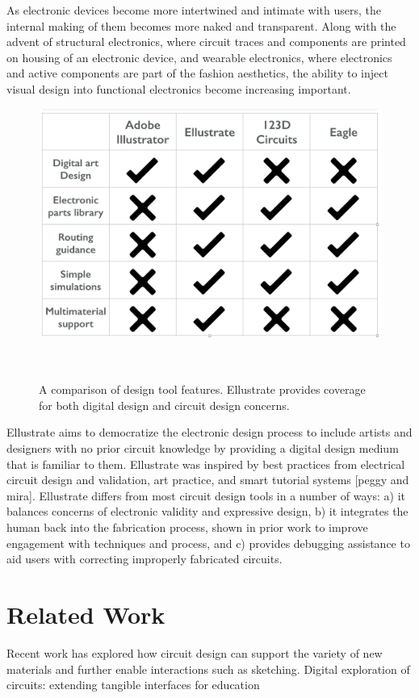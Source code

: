 \documentclass{sigchi}
\begin{document}
As electronic devices become more intertwined and intimate with users, the internal making of them becomes more naked and transparent. Along with the advent of structural electronics, where circuit traces and components are printed on housing of an electronic device, and wearable electronics, where electronics and active components are part of the fashion aesthetics, the ability to inject visual design into functional electronics become increasing important.
\begin{figure}[t]
\centering
  \includegraphics[width=1\columnwidth]{figures/Table_1}
  \caption{A comparison of design tool features. Ellustrate provides coverage for both digital design and circuit design concerns. }~\label{fig:comparison_table}
  \vspace{-16pt}
\end{figure}

Ellustrate aims to democratize the electronic design process to include artists and designers with no prior circuit knowledge by providing a digital design medium that is familiar to them.  Ellustrate was inspired by best practices from electrical circuit design and validation, art practice, and smart tutorial systems [peggy and mira]. Ellustrate differs from most circuit design tools in a number of ways: a) it balances concerns of electronic validity and expressive design, b) it integrates the human back into the fabrication process, shown in prior work to improve engagement with techniques and process, and c) provides debugging assistance to aid users with correcting improperly fabricated circuits. 





\section{Related Work}
Recent work has explored how circuit design can support the variety of new materials and further enable interactions such as sketching. 
Digital exploration of circuits: extending tangible interfaces for education 
\end{document}
